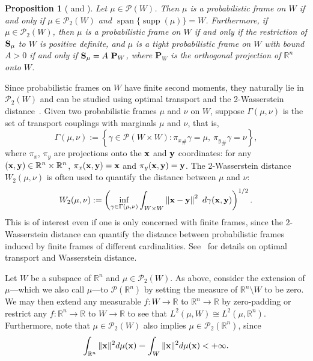\documentclass{amsart}
\numberwithin{equation}{section}
\DeclareMathOperator{\supp}{supp}
\DeclareMathOperator{\spanning}{span}
\newcommand\bR{{\mathbb R}}
\newcommand{\bP}{{\mathbf P}}
\newcommand{\cP}{{\mathcal P}}
\newcommand{\rar}{\rightarrow}
\theoremstyle{plain}
\newtheorem{proposition}[theorem]{Proposition}
\theoremstyle{remark}
\theoremstyle{definition}
\begin{document}
 \begin{proposition}[{\cite[Theorem 12.1]{ehler2013probabilistic} and \cite[Proposition 3.1]{maslouhi2019probabilistic}}] \label{TAcharacterization}
Let $\mu  \in \mathcal{P}(W)$. Then $\mu$ is a probabilistic frame on $W$ if and only if $\mu \in \mathcal{P}_2(W)$ and $\spanning\{\supp(\mu)\} = W$. Furthermore, if $\mu  \in \mathcal{P}_2(W)$, then $\mu$ is a probabilistic frame on $W$ if and only if the restriction of ${\bf S}_{\mu}$ to $W$ is positive definite, and $\mu$ is a tight probabilistic frame on $W$ with bound $A > 0$ if and only if ${\bf S}_{\mu} = A \ \bP_W$, where $\bP_W$ is the orthogonal projection of $\mathbb{R}^n$ onto $W$. 
\end{proposition}


Since probabilistic frames on $W$ have finite second moments, they naturally lie in $\mathcal{P}_2(W)$ and can be studied using optimal transport and the 2-Wasserstein distance~\cite{ehler2013probabilistic, wickman2014optimal}. Given two probabilistic frames $\mu$ and $\nu$ on $W$, suppose $\Gamma(\mu,\nu)$ is the set of transport couplings with marginals $\mu$ and $\nu$, that is,
$$ \Gamma(\mu,\nu) :=  \left \{ \gamma \in \mathcal{P}(W \times W): {\pi_{{ x}}}_{\#} \gamma = \mu, \ {\pi_{{ y}}}_{\#} \gamma = \nu \right \},$$
where $\pi_{{ x}}$, $\pi_{{ y}}$ are projections onto the ${\bf x}$ and ${\bf y}$ coordinates: for any $({\bf x},{\bf y}) \in \mathbb{R}^n \times \mathbb{R}^n $, $\pi_{{ x}}({\bf x}, {\bf y}) = {\bf x}$ and $ \pi_{{ y}}({\bf x},{\bf y}) = {\bf y}$. The 2-Wasserstein distance $ W_2(\mu,\nu)$ is often used to quantify the distance between $\mu$ and $\nu$:  
$$ W_2(\mu,\nu) := \left(\underset{\gamma \in \Gamma(\mu,\nu)}{\operatorname{inf}}  \int_{W \times W}  \left \Vert {\bf x}-{\bf y}\right \Vert^2 \ d\gamma({\bf x},{\bf y})\right)^{1/2}.$$
This is of interest even if one is only concerned with finite frames, since the $2$-Wasserstein distance can quantify the distance between probabilistic frames induced by finite frames of different cardinalities.
See~\cite{figalli2021invitation} for details on optimal transport and Wasserstein distance.


Let $W$ be a subspace of $\bR^n$ and $\mu \in \mathcal{P}_2(W)$. As above, consider the extension of $\mu$---which we also call $\mu$---to $\cP(\bR^n)$ by setting the measure of $\bR^n \setminus W$ to be zero. We may then extend any measurable $f: W \rar \bR$ to $\bR^n \rar \bR$ by zero-padding or restrict any $f: \bR^n \rar \bR$ to $W \rar \bR$ to see that $L^2(\mu, W) \cong L^2(\mu,\bR^n)$. Furthermore, note that $\mu \in \mathcal{P}_2(W)$ also implies $\mu \in \mathcal{P}_2(\mathbb{R}^n)$, since
\begin{equation*}
   \int_{\mathbb{R}^n} \Vert {\bf x} \Vert ^2 d\mu({\bf x}) = \int_{W} \Vert {\bf x} \Vert ^2 d\mu({\bf x})< + \infty .
\end{equation*}
\end{document}
